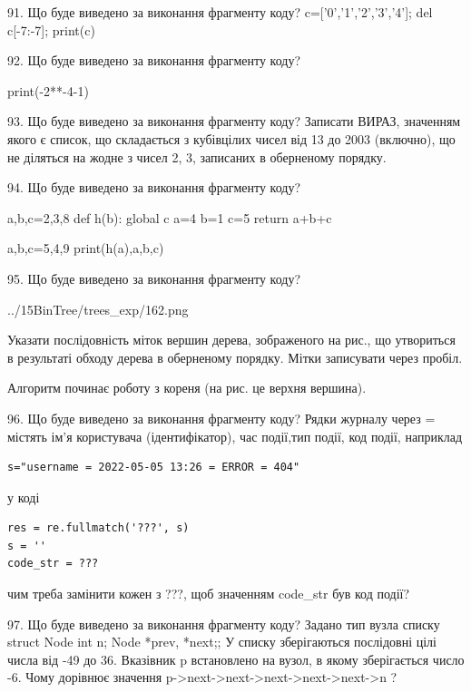 \documentclass[11pt]{article}
\begin{document}

91. Що буде виведено за виконання фрагменту коду?
c=['0','1','2','3','4']; del c[-7:-7]; print(c)

92. Що буде виведено за виконання фрагменту коду?

print(-2**-4-1)


93. Що буде виведено за виконання фрагменту коду?
Записати ВИРАЗ, значенням якого є список, що складається з кубівцілих чисел від 13 до 2003 (включно), що не діляться на жодне з чисел 2, 3, записаних в оберненому порядку.

94. Що буде виведено за виконання фрагменту коду?

a,b,c=2,3,8
def h(b):
global c    a=4
    b=1
    c=5
    return a+b+c

a,b,c=5,4,9
print(h(a),a,b,c)


95. Що буде виведено за виконання фрагменту коду?

\begin{center}
	{../15BinTree/trees_exp/162.png}
\end{center}
Указати послідовність міток вершин дерева, зображеного на рис., що утвориться в результаті обходу дерева в оберненому порядку. Мітки записувати через пробіл.\par Алгоритм починає роботу з кореня (на рис. це верхня вершина).


96. Що буде виведено за виконання фрагменту коду?
Рядки журналу через = містять ім'я користувача (ідентифікатор), час події,тип події, код події, наприклад
\begin{verbatim}
s="username = 2022-05-05 13:26 = ERROR = 404"
\end{verbatim}
у коді 
\begin{verbatim}
res = re.fullmatch('???', s) 
s = ''
code_str = ??? 
\end{verbatim}
чим треба замінити кожен з ???, щоб значенням code\_str був код події? 




97. Що буде виведено за виконання фрагменту коду?
Задано тип вузла списку struct Node {int n; Node *prev, *next;};
У списку зберігаються послідовні цілі числа від -49 до 36. Вказівник p встановлено на вузол, в якому зберігається число -6.
Чому дорівнює значення p->next->next->next->next->next->n ?
\end{document}
